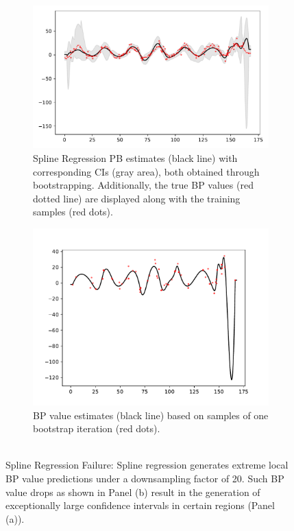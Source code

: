 \begin{figure}[!htb]
\centering
\begin{subfigure}{.5\textwidth}
    \centering
    \includegraphics[width=\linewidth]{Pictures/spline_extreme/plot_posterior_confint_spline}
    \caption{Spline Regression  PB estimates (black line) with corresponding CIs (gray area),
        both obtained through bootstrapping.
        Additionally, the true BP values (red dotted line) are displayed along
        with the training samples (red dots).}
\end{subfigure}\hfill
\begin{subfigure}{.42\textwidth}
    \centering
    \includegraphics[width=\linewidth]{Pictures/spline_extreme/plot_pred_bootstrap_spline_reg_v2_70}
  \caption[Estimate Single Bootstrap Sample]{
      BP value estimates (black line) based on samples of one bootstrap iteration (red dots).
      \\
        \\}
    \label{subfig:ex-spline-failure-bootstrap}
\end{subfigure}
\caption[Spline Regression  Failure]{
    Spline Regression  Failure:
    Spline regression  generates extreme local BP value predictions
    under a downsampling factor of 20.
    Such BP value drops as shown in Panel (b) result in
    the generation of exceptionally
    large confidence intervals in certain regions (Panel (a)).}
\label{fig:ex-spline-failure}
\end{figure}






